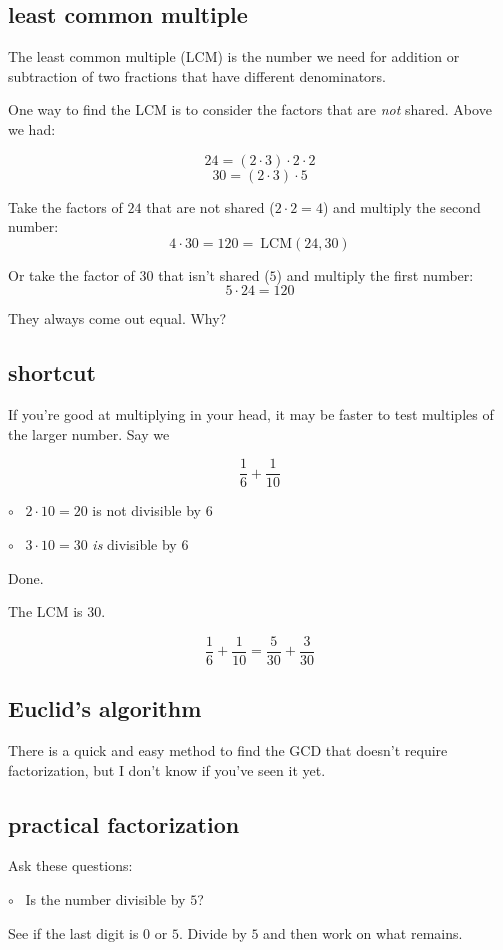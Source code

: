 \documentclass[11pt, oneside]{article}
\begin{document}
\subsection*{least common multiple}

The least common multiple (LCM) is the number we need for addition or subtraction of two fractions that have different denominators.

One way to find the LCM is to consider the factors that are \emph{not} shared.  Above we had:

\[ 24 = (2 \cdot 3) \cdot 2 \cdot 2 \]
\[ 30 = (2 \cdot 3) \cdot 5  \]

Take the factors of $24$ that are not shared ($2 \cdot 2 = 4$) and multiply the second number:  
\[ 4 \cdot 30 = 120 = \ \text{LCM}(24,30) \]

Or take the factor of $30$ that isn't shared ($5$) and multiply the first number:  
\[ 5 \cdot 24 = 120 \]

They always come out equal.  Why?

\subsection*{shortcut}
If you're good at multiplying in your head, it may be faster to test multiples of the larger number.  Say we 

\[ \frac{1}{6} + \frac{1}{10} \]

$\circ$ \ $2 \cdot 10 = 20$ is not divisible by $6$

$\circ$ \ $3 \cdot 10 = 30$ \emph{is} divisible by $6$

Done.  

The LCM is $30$.

\[ \frac{1}{6} + \frac{1}{10} = \frac{5}{30} + \frac{3}{30}  \]

\subsection*{Euclid's algorithm}
There is a quick and easy method to find the GCD that doesn't require factorization, but I don't know if you've seen it yet.

\subsection*{practical factorization}
Ask these questions:

$\circ$ \ Is the number divisible by $5$?  

See if the last digit is $0$ or $5$.  Divide by $5$ and then work on what remains.
\end{document}
